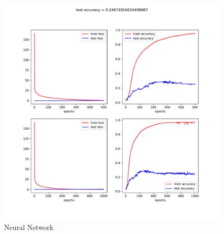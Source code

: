 \documentclass[17pt]{article}
\begin{document}
\begin{figure}
	\label{figNN}
	\includegraphics[scale=0.5]{results}
	\caption{Neural Network}
\end{figure}
\end{document}
